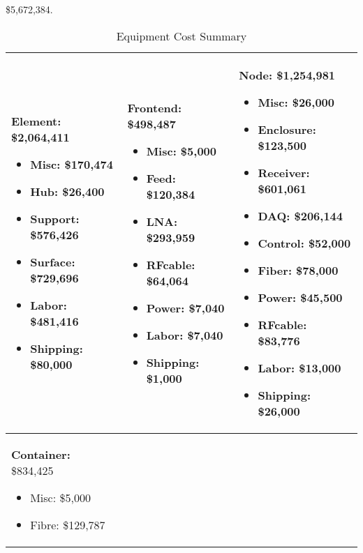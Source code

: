 \$5,672,384.

\begin{table}[t]
\centering
\caption{Equipment Cost Summary}
\label{tab:budgetsummary}
\begin{tabular}{| p{2in} | p{2in} | p{2in} | }\\ \hline
\noindent
\textbf{Element:}  \$2,064,411
\begin{itemize}[parsep=-2pt, itemsep=-3pt]
\item Misc:   \$170,474
\item Hub:   \$26,400
\item Support:   \$576,426
\item Surface:   \$729,696
\item Labor:   \$481,416
\item Shipping:   \$80,000
\end{itemize}
 &
 \noindent
\textbf{Frontend:}  \$498,487
\begin{itemize}[parsep=-2pt, itemsep=-3pt]
\item Misc:   \$5,000
\item Feed:   \$120,384
\item LNA:   \$293,959
\item RFcable:   \$64,064
\item Power:   \$7,040
\item Labor:   \$7,040
\item Shipping:   \$1,000
\end{itemize}
 &
 \noindent
\textbf{Node:}  \$1,254,981
\begin{itemize}[parsep=-2pt, itemsep=-3pt]
\item Misc:   \$26,000
\item Enclosure:   \$123,500
\item Receiver:   \$601,061
\item DAQ:   \$206,144
\item Control:   \$52,000
\item Fiber:   \$78,000
\item Power:   \$45,500
\item RFcable:   \$83,776
\item Labor:   \$13,000
\item Shipping:   \$26,000
\end{itemize}
\\ \hline
\noindent
\textbf{Container:}  \$834,425
\begin{itemize}[parsep=-2pt, itemsep=-3pt]
\item Misc:   \$5,000
\item Fibre:   \$129,787

\end{itemize}
\end{tabular}
\end{table}
